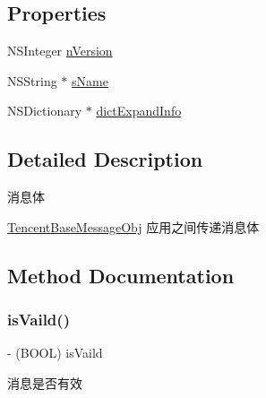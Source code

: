 \subsection*{Properties}
\begin{DoxyCompactItemize}
\item 
N\+S\+Integer \mbox{\hyperlink{interface_tencent_base_message_obj_a2e20a2b5ea570631df4e3552a5a04c81}{n\+Version}}
\item 
N\+S\+String $\ast$ \mbox{\hyperlink{interface_tencent_base_message_obj_a69f80acde004a9aa7932494e12550e2e}{s\+Name}}
\item 
N\+S\+Dictionary $\ast$ \mbox{\hyperlink{interface_tencent_base_message_obj_a406807075b0cd47ca2baeba1b1a7ed36}{dict\+Expand\+Info}}
\end{DoxyCompactItemize}


\subsection{Detailed Description}
消息体 

\mbox{\hyperlink{interface_tencent_base_message_obj}{Tencent\+Base\+Message\+Obj}} 应用之间传递消息体 

\subsection{Method Documentation}
\mbox{\label{interface_tencent_base_message_obj_ac77da86a7f7b85a99a40360bb8212cf6}} 
\subsubsection{\texorpdfstring{is\+Vaild()}{isVaild()}\hspace{0.1cm}{\footnotesize\ttfamily [1/2]}}
{\footnotesize\ttfamily -\/ (B\+O\+OL) is\+Vaild \begin{DoxyParamCaption}{ }\end{DoxyParamCaption}}

消息是否有效 \mbox{\label{interface_tencent_base_message_obj_ac77da86a7f7b85a99a40360bb8212cf6}} 
